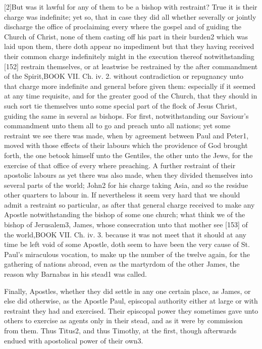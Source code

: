 [2]But was it lawful for any of them to be a bishop with restraint? True it is their charge was indefinite; yet so, that in case they did all whether severally or jointly discharge the office of proclaiming every where the gospel and of guiding the Church of Christ, none of them casting off his part in their burden2 which was laid upon them, there doth appear no impediment but that they having received their common charge indefinitely might in the execution thereof notwithstanding [152] restrain themselves, or at leastwise be restrained by the after commandment of the Spirit,BOOK VII. Ch. iv. 2. without contradiction or repugnancy unto that charge more indefinite and general before given them: especially if it seemed at any time requisite, and for the greater good of the Church, that they should in such sort tie themselves unto some special part of the flock of Jesus Christ, guiding the same in several as bishops. For first, notwithstanding our Saviour’s commandment unto them all to go and preach unto all nations; yet some restraint we see there was made, when by agreement between Paul and Peter1, moved with those effects of their labours which the providence of God brought forth, the one betook himself unto the Gentiles, the other unto the Jews, for the exercise of that office of every where preaching. A further restraint of their apostolic labours as yet there was also made, when they divided themselves into several parts of the world; John2 for his charge taking Asia, and so the residue other quarters to labour in. If nevertheless it seem very hard that we should admit a restraint so particular, as after that general charge received to make any Apostle notwithstanding the bishop of some one church; what think we of the bishop of Jerusalem3, James, whose consecration unto that mother see [153] of the world,BOOK VII. Ch. iv. 3. because it was not meet that it should at any time be left void of some Apostle, doth seem to have been the very cause of St. Paul’s miraculous vocation, to make up the number of the twelve again, for the gathering of nations abroad, even as the martyrdom of the other James, the reason why Barnabas in his stead1 was called.

Finally, Apostles, whether they did settle in any one certain place, as James, or else did otherwise, as the Apostle Paul, episcopal authority either at large or with restraint they had and exercised. Their episcopal power they sometimes gave unto others to exercise as agents only in their stead, and as it were by commission from them. Thus Titus2, and thus Timothy, at the first, though afterwards endued with apostolical power of their own3.

